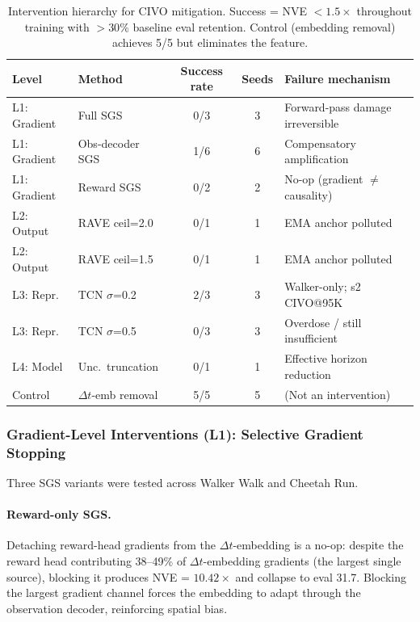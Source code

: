 \documentclass[10pt,letterpaper]{article}
\newcommand{\dt}{\Delta t}
\begin{document}
\begin{table}[h]
\centering
\caption{Intervention hierarchy for CIVO mitigation. Success = NVE $< 1.5\times$ throughout training with $> 30\%$ baseline eval retention. Control (embedding removal) achieves 5/5 but eliminates the feature.}
\label{tab:intervention_hierarchy}
\small
\begin{tabular}{llccl}
\toprule
\textbf{Level} & \textbf{Method} & \textbf{Success rate} & \textbf{Seeds} & \textbf{Failure mechanism} \\
\midrule
L1: Gradient & Full SGS           & 0/3  & 3  & Forward-pass damage irreversible \\
L1: Gradient & Obs-decoder SGS    & 1/6  & 6  & Compensatory amplification \\
L1: Gradient & Reward SGS         & 0/2  & 2  & No-op (gradient $\neq$ causality) \\
L2: Output   & RAVE ceil=2.0      & 0/1  & 1  & EMA anchor polluted \\
L2: Output   & RAVE ceil=1.5      & 0/1  & 1  & EMA anchor polluted \\
L3: Repr.    & TCN $\sigma$=0.2   & 2/3  & 3  & Walker-only; s2 CIVO@95K \\
L3: Repr.    & TCN $\sigma$=0.5   & 0/3  & 3  & Overdose / still insufficient \\
\midrule
L4: Model    & Unc.\ truncation   & 0/1  & 1  & Effective horizon reduction \\
\midrule
Control      & $\dt$-emb removal  & 5/5  & 5  & (Not an intervention) \\
\bottomrule
\end{tabular}
\end{table}

\subsubsection{Gradient-Level Interventions (L1): Selective Gradient Stopping}

Three SGS variants were tested across Walker Walk and Cheetah Run.

\paragraph{Reward-only SGS.} Detaching reward-head gradients from the $\dt$-embedding is a no-op: despite the reward head contributing 38--49\% of $\dt$-embedding gradients (the largest single source), blocking it produces NVE = $10.42\times$ and collapse to eval 31.7. Blocking the largest gradient channel forces the embedding to adapt through the observation decoder, reinforcing spatial bias.
\end{document}
